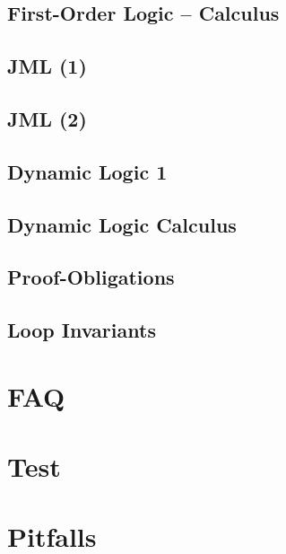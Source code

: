 \documentclass[12pt,accentcolor=tud1b,bibtotoc,colorback,linedtoc,liststotoc,bigchapter,noresetcounter]{tudreport}
\begin{document}
\newpage

\section{First-Order Logic -- Calculus}

\newpage

\section{JML (1)}

\newpage

\section{JML (2)}

\newpage

\section{Dynamic Logic 1}

\newpage

\section{Dynamic Logic Calculus}

\newpage

\section{Proof-Obligations}

\newpage

\section{Loop Invariants}

\newpage



\chapter{FAQ}



\chapter{Test}



\chapter{Pitfalls}

 
\end{document}
